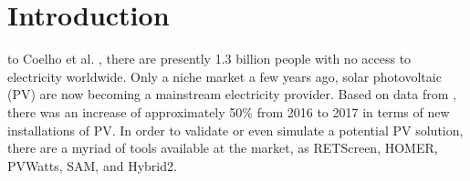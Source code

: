 \documentclass[journal]{IEEEtran}
\begin{document}
\section{Introduction}
% 
% 
% 
% 
 to Coelho et al. \cite{Coelho}, there are presently 1.3 billion people with no access to electricity worldwide. 
%
Only a niche market a few years ago, solar photovoltaic (PV) are now becoming a mainstream electricity provider.
Based on data from \cite{EPIA}, there was an increase of approximately 50\% from 2016 to 2017 in terms of new installations of PV. 
% 
%
In order to validate or even simulate a potential PV solution, there are a myriad of tools available at the market, as RETScreen, HOMER, PVWatts, SAM, and Hybrid2.
\end{document}
